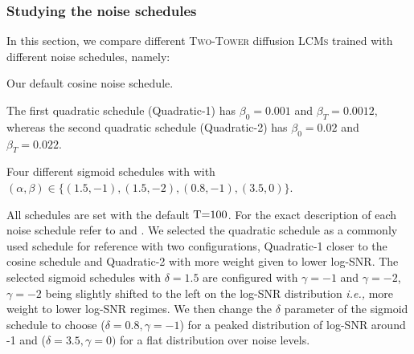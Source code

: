 \documentclass[twoside,11pt]{fairmeta}
\newcommand{\lcms}{\textsc{LCMs}\xspace}
\newcommand{\twotower}{\textsc{Two-Tower}\xspace}
\newcommand{\ie}{\textit{i.e.,}\xspace}
\def\rT{{\textnormal{T}}}
\begin{document}
\subsubsection{Studying the noise schedules}
In this section, we compare different \twotower diffusion \lcms trained with different noise schedules, namely:
\begin{description}[style=unboxed,leftmargin=0cm]
    \item[Cosine.] Our default cosine noise schedule.
    \item[Quadratic.] The first quadratic schedule (Quadratic-1) has $\beta_0=0.001$ and $\beta_T=0.0012$, whereas the second quadratic schedule (Quadratic-2) has $\beta_0=0.02$ and $\beta_T=0.022$.
    \item[Sigmoid.] Four different sigmoid schedules with with $(\alpha,\beta) \in \{(1.5, -1), (1.5, -2), (0.8, -1), (3.5, 0)\}$.
\end{description}
All schedules are set with the default $\rT{=}100$. For the exact description of each noise schedule refer to  and .
We selected the quadratic schedule as a commonly used schedule for reference with two configurations, Quadratic-1 closer to the cosine schedule and Quadratic-2 with more weight given to lower log-SNR. The selected sigmoid schedules with $\delta=1.5$ are configured with $\gamma=-1$ and $\gamma=-2$, $\gamma=-2$ being slightly shifted to the left on the log-SNR distribution \ie more weight to lower log-SNR regimes. We then change the $\delta$ parameter of the sigmoid schedule to choose ($\delta=0.8, \gamma=-1$) for a peaked distribution of log-SNR around -1 and ($\delta=3.5, \gamma=0)$ for a flat distribution over noise levels.
\end{document}
